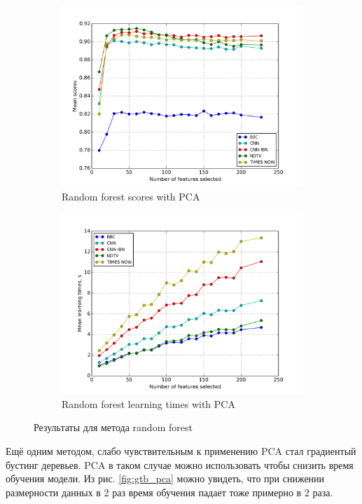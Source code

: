 \begin{figure}[h!]
    \centering
	\begin{subfigure}{0.45\textwidth}
		\includegraphics[width=\textwidth]{images/PCA-randfor.png}
		\caption{Random forest scores with PCA}
	\end{subfigure}
	\begin{subfigure}{0.45\textwidth}
		\includegraphics[width=\textwidth]{images/PCA-randforTime.png}
		\caption{Random forest learning times with PCA}
	\end{subfigure}
	\caption{Результаты для метода random forest}\label{fig:randfor_pca}
\end{figure} 
 
\par
Ещё одним методом, слабо чувствительным к применению PCA стал градиентый бустинг деревьев. PCA в таком случае можно использовать чтобы снизить время обучения модели. Из рис. \ref{fig:gtb_pca} можно увидеть, что при снижении размерности данных в 2 раз время обучения падает тоже примерно в 2 раза.


